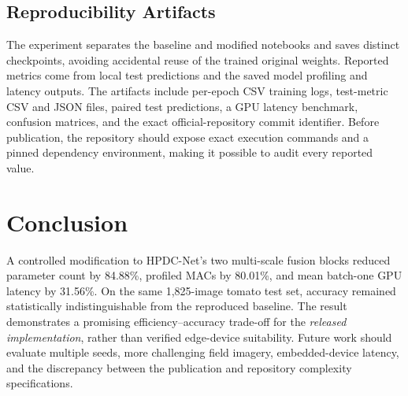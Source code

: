 \documentclass[conference,10pt]{IEEEtran}
\begin{document}
\subsection{Reproducibility Artifacts}
The experiment separates the baseline and modified notebooks and saves distinct checkpoints, avoiding accidental reuse of the trained original weights. Reported metrics come from local test predictions and the saved model profiling and latency outputs. The artifacts include per-epoch CSV training logs, test-metric CSV and JSON files, paired test predictions, a GPU latency benchmark, confusion matrices, and the exact official-repository commit identifier. Before publication, the repository should expose exact execution commands and a pinned dependency environment, making it possible to audit every reported value.

\section{Conclusion}
A controlled modification to HPDC-Net's two multi-scale fusion blocks reduced parameter count by 84.88\%, profiled MACs by 80.01\%, and mean batch-one GPU latency by 31.56\%. On the same 1,825-image tomato test set, accuracy remained statistically indistinguishable from the reproduced baseline. The result demonstrates a promising efficiency--accuracy trade-off for the \emph{released implementation}, rather than verified edge-device suitability. Future work should evaluate multiple seeds, more challenging field imagery, embedded-device latency, and the discrepancy between the publication and repository complexity specifications.

\balance
\end{document}
